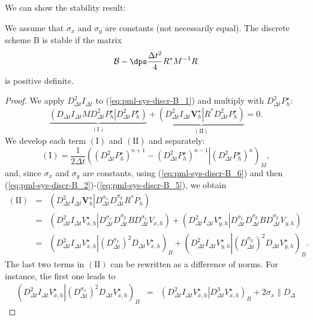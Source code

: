 \documentclass[a4paper]{article}
\def\bVs{\boldsymbol{V}^{\star}}
\def\Vs{V^{\star}}
\def\Ps{P^{\star}}
\begin{document}
We can  show the stability result: 
\begin{theo}\label{th:B}
We assume that $\sigma_x$ and $\sigma_y$ are constants (not
necessarily equal). The discrete scheme B is stable if the matrix
\begin{equation}\label{eq:cond_B}
{\cal B}- \dps \frac{\Delta t^2}{4}R^{*}M^{-1} R 
\end{equation}
is positive definite.
\end{theo}
\begin{proof}
We apply $D_{\Delta t}^2I_{\Delta t}$ to (\ref{eq:pml-sys-discr-B_1}) and
multiply with $D_{\Delta t}^2 \Ps_{h}$:
 \[
 \underbrace{(D_{\Delta t}I_{\Delta t} M D_{\Delta t}^2\Ps_{h}   \left. \right|  D_{\Delta
     t}^2 \Ps_{h})}_{(\mathrm{I})}+ \underbrace{(D_{\Delta t}^2I_{\Delta t} \bVs_h   \left. \right| 
     R^{*} D_{\Delta
     t}^2 \Ps_{h})}_{(\mathrm{II})}=0.
 \]
We develop each term $(\mathrm{I})$ and $(\mathrm{II})$ and separately:
\[
(\mathrm{I})= \frac{1}{2\Delta t} \left((D_{\Delta
     t}^2 \Ps_{h})^{n+1}-(D_{\Delta
     t}^2 \Ps_{h})^{n-1}  \left. \right|  (D_{\Delta
     t}^2 \Ps_{h})^{n}\right)_M, 
\]
and, since $\sigma_x$ and $\sigma_y$ are constants, using (\ref{eq:pml-sys-discr-B_6}) 
and then (\ref{eq:pml-sys-discr-B_2})-(\ref{eq:pml-sys-discr-B_5}), we obtain
\[\begin{array}{lcl}
(\mathrm{II}) &=& (D_{\Delta t}^2I_{\Delta t} \bVs_h  \left. \right|     D_{\Delta t}^{\sigma_x}
D_{\Delta t}^{\sigma_y}   R^{*} P_{h})\\[12pt]
&=& (D_{\Delta t}^2I_{\Delta t} \Vs_{x,h}   \left. \right|     D_{\Delta t}^{\sigma_x}
D_{\Delta t}^{\sigma_y}  B D_{\Delta t}^{\sigma_x}  V_{x,h} ) + 
(D_{\Delta t}^2I_{\Delta t} \Vs_{y,h}  \left. \right|     D_{\Delta t}^{\sigma_x}
D_{\Delta t}^{\sigma_y}  B D_{\Delta t}^{\sigma_y}  V_{y,h} )
\\[12pt]
&=& (D_{\Delta t}^2I_{\Delta t} \Vs_{x,h}  \left. \right|     (D_{\Delta t}^{\sigma_x})^2
   D_{\Delta t}  \Vs_{x,h} )_B + 
(D_{\Delta t}^2I_{\Delta t} \Vs_{y,h}  \left. \right|     
(D_{\Delta t}^{\sigma_y})^2   D_{\Delta t}  \Vs_{y,h} )_B.
\end{array}
\]
The last two terms in $(\mathrm{II})$ can be rewritten as a difference
of norms. For instance, the first one leads to
\[
\begin{array}{lcl}
(D_{\Delta t}^2I_{\Delta t} \Vs_{x,h} \left. \right|     (D_{\Delta t}^{\sigma_x})^2
   D_{\Delta t}  \Vs_{x,h} )_B&=& (D_{\Delta t}^2I_{\Delta t} \Vs_{x,h}  \left. \right| 
   D_{\Delta t}^3 \Vs_{x,h} )_B + 2 \sigma_x \left\| D_{\Delta
}
\end{array}\]
\end{proof}
\end{document}
